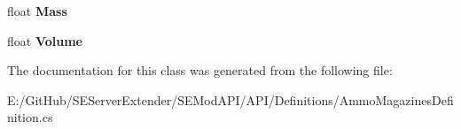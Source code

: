 \begin{DoxyCompactItemize}
\item 
\hypertarget{class_s_e_mod_a_p_i_1_1_a_p_i_1_1_definitions_1_1_ammo_magazines_definition_a8d23a0593174c75b8cd235f8da3e9d20}{}float {\bfseries Mass}\label{class_s_e_mod_a_p_i_1_1_a_p_i_1_1_definitions_1_1_ammo_magazines_definition_a8d23a0593174c75b8cd235f8da3e9d20}

\item 
\hypertarget{class_s_e_mod_a_p_i_1_1_a_p_i_1_1_definitions_1_1_ammo_magazines_definition_a09ddb61157d6ef4227c7aedcf4a99e02}{}float {\bfseries Volume}\label{class_s_e_mod_a_p_i_1_1_a_p_i_1_1_definitions_1_1_ammo_magazines_definition_a09ddb61157d6ef4227c7aedcf4a99e02}

\end{DoxyCompactItemize}


The documentation for this class was generated from the following file\+:\begin{DoxyCompactItemize}
\item 
E\+:/\+Git\+Hub/\+S\+E\+Server\+Extender/\+S\+E\+Mod\+A\+P\+I/\+A\+P\+I/\+Definitions/Ammo\+Magazines\+Definition.\+cs\end{DoxyCompactItemize}
